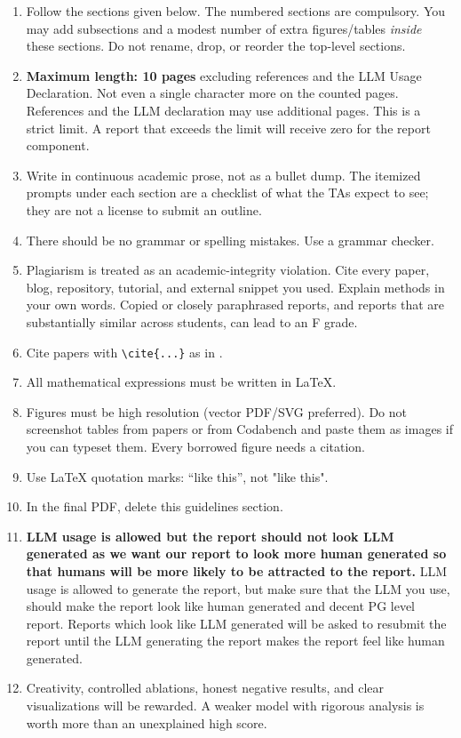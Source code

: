 \documentclass[11pt, oneside]{article}
\begin{document}
\begin{enumerate}[leftmargin=*]
    \item Follow the sections given below. The numbered sections are compulsory. You may add subsections and a modest number of extra figures/tables \emph{inside} these sections. Do not rename, drop, or reorder the top-level sections.
    \item \textbf{Maximum length: 10 pages} excluding references and the LLM Usage Declaration. Not even a single character more on the counted pages. References and the LLM declaration may use additional pages. This is a strict limit. A report that exceeds the limit will receive zero for the report component.
    \item Write in continuous academic prose, not as a bullet dump. The itemized prompts under each section are a checklist of what the TAs expect to see; they are not a license to submit an outline.
    \item There should be no grammar or spelling mistakes. Use a grammar checker.
    \item Plagiarism is treated as an academic-integrity violation. Cite every paper, blog, repository, tutorial, and external snippet you used. Explain methods in your own words. Copied or closely paraphrased reports, and reports that are substantially similar across students, can lead to an F grade.
    \item Cite papers with \texttt{\textbackslash cite\{...\}} as in \cite{vaswani2017attention}. 
    \item All mathematical expressions must be written in \LaTeX.
    \item Figures must be high resolution (vector PDF/SVG preferred). Do not screenshot tables from papers or from Codabench and paste them as images if you can typeset them. Every borrowed figure needs a citation. 
    \item Use \LaTeX{} quotation marks: ``like this'', not "like this".
    \item In the final PDF, delete this guidelines section.
    \item \textbf{LLM usage is allowed but the report should not look LLM generated as we want our report to look more human generated so that humans will be more likely to be attracted to the report.} LLM usage is allowed to generate the report, but make sure that the LLM you use, should make the report look like human generated and decent PG level report. Reports which look like LLM generated will be asked to resubmit the report until the LLM generating the report makes the report feel like human generated.
    \item Creativity, controlled ablations, honest negative results, and clear visualizations will be rewarded. A weaker model with rigorous analysis is worth more than an unexplained high score.
\end{enumerate}
\end{document}
